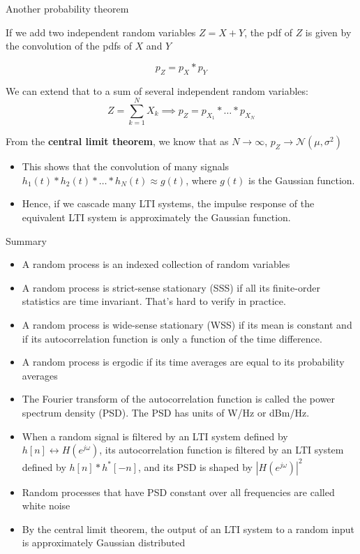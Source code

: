 \documentclass[10pt, aspectratio=169]{beamer}
\begin{document}
\begin{frame}{Another probability theorem}

If we add two independent random variables $Z = X + Y$, the pdf of $Z$ is given by the convolution of the pdfs of $X$ and $Y$

\begin{equation*}
p_Z = p_X \ast p_Y
\end{equation*}

\pause
We can extend that to a sum of several independent random variables:
\begin{equation*}
Z = \sum_{k=1}^N X_k \implies p_Z = p_{X_1} \ast \ldots \ast p_{X_N}
\end{equation*}

\pause
From the \textbf{central limit theorem}, we know that as $N\to\infty$,  $p_Z\to\mathcal{N}(\mu, \sigma^2)$

\begin{itemize}
	\item This shows that the convolution of many signals $h_1(t) \ast h_2(t) \ast \ldots \ast h_N(t) \approx g(t)$, where $g(t)$ is the Gaussian function.
	\item Hence, if we cascade many LTI systems, the impulse response of the equivalent LTI system is approximately the Gaussian function.
\end{itemize}


\end{frame}

\begin{frame}{Summary}
\begin{itemize}
	\item A random process is an indexed collection of random variables
	\item A random process is strict-sense stationary (SSS) if all its finite-order statistics are time invariant. That's hard to verify in practice.
	\item A random process is wide-sense stationary (WSS) if its mean is constant and if its autocorrelation function is only a function of the time difference. 
	\item A random process is ergodic if its time averages are equal to its probability averages
	\item The Fourier transform of the autocorrelation function is called the power spectrum density (PSD). The PSD has units of W/Hz or dBm/Hz.
	\item When a random signal is filtered by an LTI system defined by $h[n]\leftrightarrow H(e^{j\omega})$, its autocorrelation function is filtered by an LTI system defined by $h[n]\ast h^*[-n]$, and its PSD is shaped by $|H(e^{j\omega})|^2$
	\item Random processes that have PSD constant over all frequencies are called white noise
	\item By the central limit theorem, the output of an LTI system to a random input is approximately Gaussian distributed
	
\end{itemize}
\end{frame}
\end{document}
